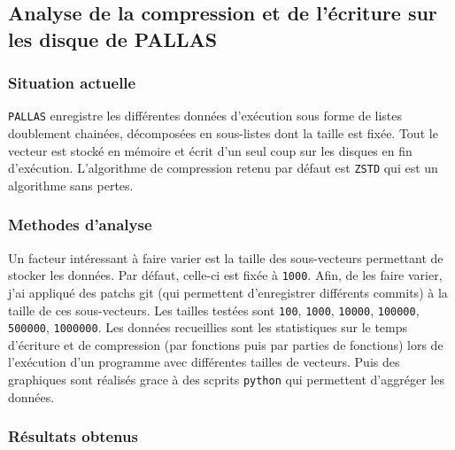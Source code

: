 \subsection{Analyse de la compression et de l'écriture sur les disque de PALLAS}\label{ssce:wrt_write}

\subsubsection{Situation actuelle}\label{ssec:wrt_situ}

\verb!PALLAS! enregistre les différentes données d'exécution sous forme de listes doublement chainées, décomposées en sous-listes dont la taille est fixée.
Tout le vecteur est stocké en mémoire et écrit d'un seul coup sur les disques en fin d'exécution.
L'algorithme de compression retenu par défaut est \verb!ZSTD! qui est un algorithme sans pertes.

\subsubsection{Methodes d'analyse}\label{ssec:wrt_analysis}

Un facteur intéressant à faire varier est la taille des sous-vecteurs permettant de stocker les données. Par défaut, celle-ci est fixée à \verb!1000!.
Afin, de les faire varier, j'ai appliqué des patchs git (qui permettent d'enregistrer différents commits) à la taille de ces sous-vecteurs.
Les tailles testées sont \verb!100!, \verb!1000!, \verb!10000!, \verb!100000!, \verb!500000!, \verb!1000000!.
Les données recueillies sont les statistiques sur le temps d'écriture et de compression (par fonctions puis par parties de fonctions) lors de l'exécution
d'un programme avec différentes tailles de vecteurs.
Puis des graphiques sont réalisés grace à des scprits \verb!python! qui permettent d'aggréger les données. 

\subsubsection{Résultats obtenus}\label{ssec:wrt_res}

